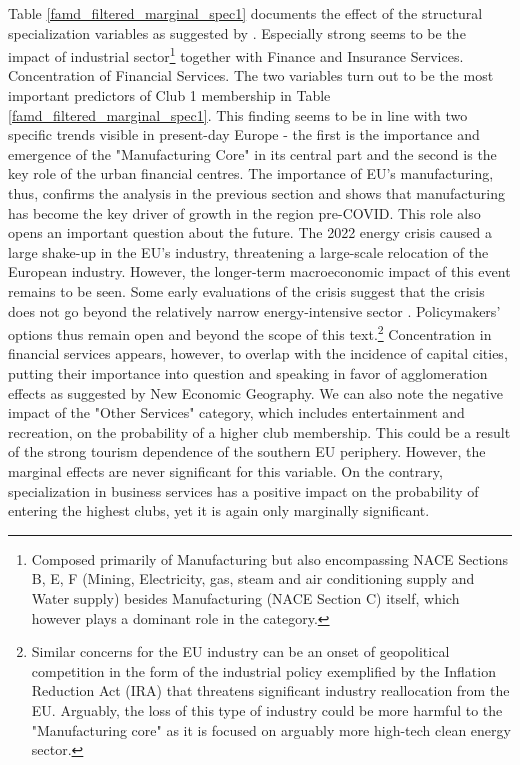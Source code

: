 \documentclass[11pt]{article}
\begin{document}
Table \ref{famd_filtered_marginal_spec1} documents the effect of the structural specialization variables as suggested by \citet{cutrini2019economic}. Especially strong seems to be the impact of industrial sector\footnote{Composed primarily of Manufacturing but also encompassing NACE Sections B, E, F (Mining, Electricity, gas, steam and air conditioning supply and Water supply) besides Manufacturing (NACE Section C) itself, which however plays a dominant role in the category.} together with Finance and Insurance Services. Concentration of Financial Services. The two variables turn out to be the most important predictors of Club 1 membership in Table \ref{famd_filtered_marginal_spec1}. This finding seems to be in line with two specific trends visible in present-day Europe - the first is the importance and emergence of the "Manufacturing Core" in its central part and the second is the key role of the urban financial centres. The importance of EU's manufacturing, thus, confirms the analysis in the previous section and shows that manufacturing has become the key driver of growth in the region pre-COVID. This role also opens an important question about the future. The 2022 energy crisis caused a large shake-up in the EU's industry, threatening a large-scale relocation of the European industry. However, the longer-term macroeconomic impact of this event remains to be seen. Some early evaluations of the crisis suggest that the crisis does not go beyond the relatively narrow energy-intensive sector \citep{sgaravatti2023adjusting}. Policymakers' options thus remain open and beyond the scope of this text.\footnote{Similar concerns for the EU industry can be an onset of geopolitical competition in the form of the industrial policy exemplified by the Inflation Reduction Act (IRA) that threatens significant industry reallocation from the EU. Arguably, the loss of this type of industry could be more harmful to the "Manufacturing core" as it is focused on arguably more high-tech clean energy sector.} Concentration in financial services appears, however, to overlap with the incidence of capital cities, putting their importance into question and speaking in favor of agglomeration effects as suggested by New Economic Geography.
We can also note the negative impact of the "Other Services" category, which includes entertainment and recreation, on the probability of a higher club membership. This could be a result of the strong tourism dependence of the southern EU periphery. However, the marginal effects are never significant for this variable. On the contrary, specialization in business services has a positive impact on the probability of entering the highest clubs, yet it is again only marginally significant.
\end{document}
